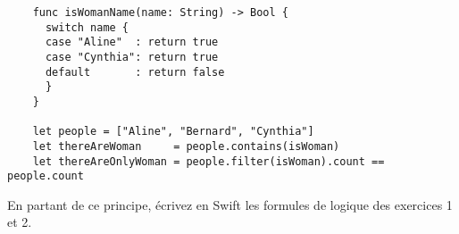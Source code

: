 \documentclass[a4paper, titlepage]{article}
\numberwithin{figure}{section}
\numberwithin{table}{section}
\begin{document}
    \begin{lstlisting}
    func isWomanName(name: String) -> Bool {
      switch name {
      case "Aline"  : return true
      case "Cynthia": return true
      default       : return false
      }
    }

    let people = ["Aline", "Bernard", "Cynthia"]
    let thereAreWoman     = people.contains(isWoman)
    let thereAreOnlyWoman = people.filter(isWoman).count == people.count
    \end{lstlisting}

    En partant de ce principe, écrivez en Swift les formules de logique des exercices 1 et 2.
\end{document}
